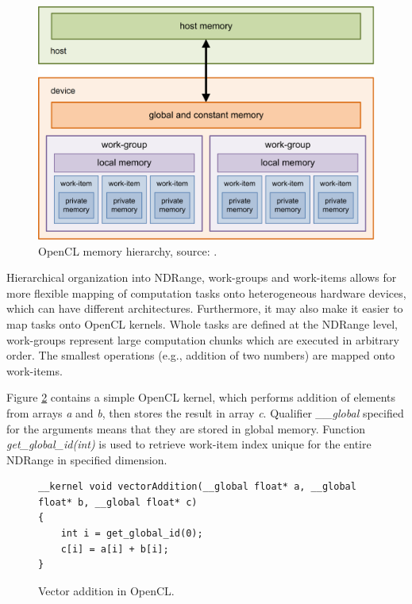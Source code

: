 \documentclass
[
    digital, %
    oneside, %
    table, %
    nolof, %
    nolot, %
    nocover %
]{fithesis3}
\begin{document}
\begin{figure}
    \begin{center}
    \includegraphics[width=125mm]{resources/opencl_hierarchy.png}
    \end{center}
    \caption{OpenCL memory hierarchy, source: \cite{opencl-hierarchy-diagram}.}
    \label{opencl-hierarchy}
\end{figure}

Hierarchical organization into NDRange, work-groups and work-items allows for more flexible mapping of computation tasks onto heterogeneous hardware
devices, which can have different architectures. Furthermore, it may also make it easier to map tasks onto OpenCL kernels. Whole tasks are defined
at the NDRange level, work-groups represent large computation chunks which are executed in arbitrary order. The smallest operations (e.g., addition of
two numbers) are mapped onto work-items.

Figure \ref{vector_addition} contains a simple OpenCL kernel, which performs addition of elements from arrays \textit{a} and \textit{b}, then stores
the result in array \textit{c}. Qualifier \textit{\_\_global} specified for the arguments means that they are stored in global memory. Function
\textit{get\_global\_id(int)} is used to retrieve work-item index unique for the entire NDRange in specified dimension.
\begin{figure}
\begin{lstlisting}
__kernel void vectorAddition(__global float* a, __global float* b, __global float* c)
{
    int i = get_global_id(0);
    c[i] = a[i] + b[i];
}
\end{lstlisting}
\caption{Vector addition in OpenCL.}
\label{vector_addition}
\end{figure}
\end{document}
